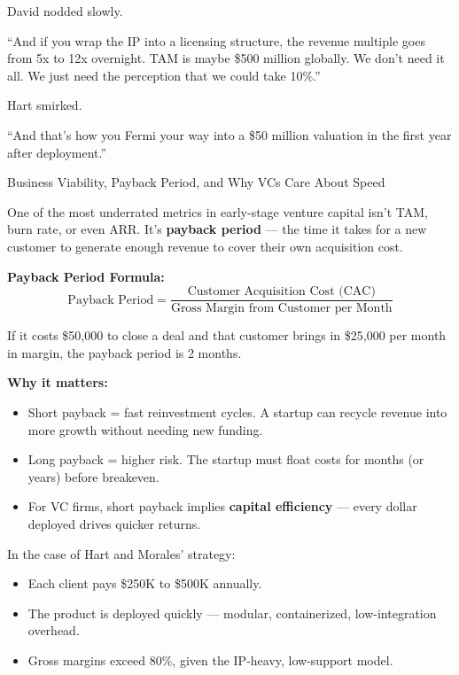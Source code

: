 David nodded slowly.

``And if you wrap the IP into a licensing structure, the revenue multiple goes from 5x to 12x overnight.  
TAM is maybe \$500 million globally. We don’t need it all. We just need the perception that we could take 10\%.''

Hart smirked.

``And that’s how you Fermi your way into a \$50 million valuation in the first year after deployment.''


\medskip

\begin{TechnicalSidebar}{Business Viability, Payback Period, and Why VCs Care About Speed}

  One of the most underrated metrics in early-stage venture capital isn’t TAM, burn rate, or even ARR.  
  It’s \textbf{payback period} — the time it takes for a new customer to generate enough revenue to cover their own acquisition cost.
  
  \medskip
  
  \textbf{Payback Period Formula:}
  \[
  \text{Payback Period} = \frac{\text{Customer Acquisition Cost (CAC)}}{\text{Gross Margin from Customer per Month}}
  \]
  
  \medskip
  
  If it costs \$50,000 to close a deal and that customer brings in \$25,000 per month in margin,  
  the payback period is 2 months.
  
  \medskip
  
  \textbf{Why it matters:}
  
  \begin{itemize}
    \item Short payback = fast reinvestment cycles. A startup can recycle revenue into more growth without needing new funding.
    \item Long payback = higher risk. The startup must float costs for months (or years) before breakeven.
    \item For VC firms, short payback implies \textbf{capital efficiency} — every dollar deployed drives quicker returns.
  \end{itemize}
  
  \medskip
  
  In the case of Hart and Morales’ strategy:

  \medskip
  
  \begin{itemize}
    \item Each client pays \$250K to \$500K annually.
    \item The product is deployed quickly — modular, containerized, low-integration overhead.
    \item Gross margins exceed 80\%, given the IP-heavy, low-support model.
  \end{itemize}
  

\end{TechnicalSidebar}
